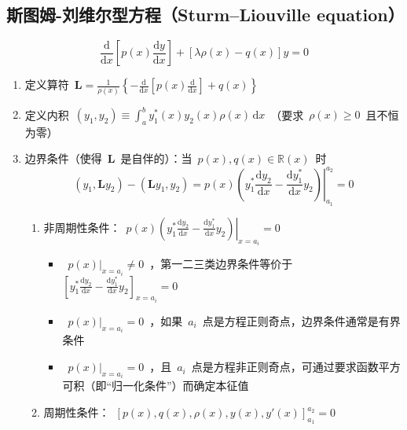 \documentclass[12pt,a4paper]{article}
\newcommand\dif{\mathrm{d}}
\newcommand\diff{\,\mathrm{d}}
\renewcommand{\[}{\ $\displaystyle}
\renewcommand{\]}{$\ }%
\newcommand{\fdif}[2]{\ensuremath{\frac{\dif #1}{\dif #2}}}
\begin{document}
	\subsection{斯图姆-刘维尔型方程（Sturm–Liouville equation）}
		$$
		  \fdif{}{x}\left[p(x)\fdif{y}{x}\right] + [\lambda \rho(x) - q(x)]y = 0
		$$
		\begin{enumerate}
		 \item 定义算符\[\bm{L} = \frac{1}{\rho(x)}\left\{-\fdif{}{x}\left[p(x)\fdif{}{x}\right] + q(x)\right\}\]
		 \item 定义内积\[(y_1,y_2) \equiv \int_a^b y_1^*(x)y_2(x)\rho(x)\diff x\]（要求\[\rho(x)\ge 0\]且不恒为零）
		 \item 边界条件（使得\[\bm L\]是自伴的）：当\[p(x),q(x)\in \mathbb{R} (x)\]时
		 $$
		 (y_1,\bm{L}y_2) - (\bm{L}y_1,y_2) = \left. p(x)\left(y_1^*\fdif{y_2}{x} - \fdif{y_1^*}{x}y_2\right)\right|_{a_1}^{a_2} = 0
		 $$
		 	\begin{enumerate}
		 	 \item 非周期性条件：\[\left.p(x)\left(y_1^*\fdif{y_2}{x} - \fdif{y_1^*}{x}y_2\right)\right|_{x= a_i}= 0\]
		 	 \begin{itemize}
		 		\item \[p(x)|_{x = a_i}\neq 0\]，第一二三类边界条件等价于\[\left[y_1^*\fdif{y_2}{x} - \fdif{y_1^*}{x}y_2\right]_{x=a_i} = 0\]
		 		\item \[p(x)|_{x = a_i} = 0\]，如果\[a_i\]点是方程正则奇点，边界条件通常是有界条件
		 		\item \[p(x)|_{x = a_i} = 0\]，且\[a_i\]点是方程非正则奇点，可通过要求函数平方可积（即“归一化条件”）而确定本征值
		 	 \end{itemize}
		 	 \item 周期性条件：\[[p(x),q(x),\rho(x),y(x),y'(x)]_{a_1}^{a_2} = 0\]
		 	\end{enumerate}
		\end{enumerate}
		
\end{document}
